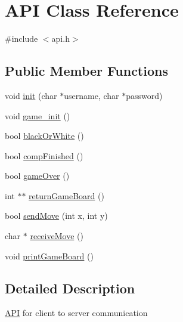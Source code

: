 \hypertarget{classAPI}{\section{A\+P\+I Class Reference}
\label{classAPI}
}


{\ttfamily \#include $<$api.\+h$>$}

\subsection*{Public Member Functions}
\begin{DoxyCompactItemize}
\item 
void \hyperlink{classAPI_af7bd4fdb68629bec3b6c24844a1830e7}{init} (char $\ast$username, char $\ast$password)
\item 
void \hyperlink{classAPI_a7846659d7d45933b2ec00326963f6072}{game\+\_\+init} ()
\item 
bool \hyperlink{classAPI_a1472d4f4e56004629be869a03cfae406}{black\+Or\+White} ()
\item 
bool \hyperlink{classAPI_aa8c468e970c29e8e072fa3b8b6ffb2fb}{comp\+Finished} ()
\item 
bool \hyperlink{classAPI_a0a86ff50b0af9206daa26814b92d3f9e}{game\+Over} ()
\item 
int $\ast$$\ast$ \hyperlink{classAPI_abddda79b2caa97fa3eca6f3e0bd07b9c}{return\+Game\+Board} ()
\item 
bool \hyperlink{classAPI_a7a560e71b7b99556e7d253c5d9bf8f77}{send\+Move} (int x, int y)
\item 
char $\ast$ \hyperlink{classAPI_a3f5c33c97bce4cf54cbdba75802cc6f2}{receive\+Move} ()
\item 
void \hyperlink{classAPI_a73b6f2b3c9d7cff5608604a77afedd8b}{print\+Game\+Board} ()
\end{DoxyCompactItemize}


\subsection{Detailed Description}
\hyperlink{classAPI}{A\+P\+I} for client to server communication 

